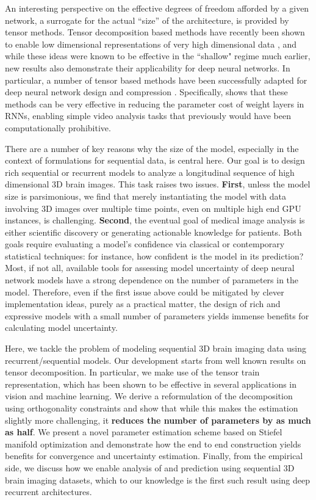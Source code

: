 An interesting perspective on the effective degrees of freedom afforded 
by a given network, a surrogate for the actual ``size'' of the architecture, 
is provided by tensor methods.
Tensor decomposition based methods have recently been shown to enable low dimensional representations of very high dimensional data \citep{hwangCvpr18}, 
and while these ideas were known to be effective in the ``shallow" regime much earlier, new results also demonstrate their applicability for deep neural 
networks. 
In particular, a number of tensor based methods have been successfully adapted for deep neural network design and compression \citep{cohen2016expressive,zhang2017tucker,yu2017compressing,xiong2019antnets}.
Specifically, \cite{pmlr-v70-yang17e} shows that these methods can be very effective in reducing the parameter cost of weight layers in RNNs, enabling simple video analysis tasks that previously would have been computationally prohibitive.

There are a number of key reasons why the size of the model, especially in the context of formulations for sequential data, is central here. Our goal is to design rich sequential or recurrent models to analyze a longitudinal sequence of high dimensional 3D brain images. 
This task raises two issues. \textbf{First}, 
unless the model size is parsimonious, we find that merely instantiating the 
model with data involving 3D images over multiple time points, even on multiple high end GPU instances, is challenging.
\textbf{Second}, 
the eventual goal of medical image analysis is either scientific discovery or generating 
actionable knowledge for patients. 
Both goals require evaluating a model's confidence via 
classical or contemporary statistical techniques: for instance, how confident is the model in its prediction?  
Most, if not all, available tools for assessing 
model uncertainty of deep neural network models 
have a strong dependence on the number of parameters in 
the model. Therefore, even if the first issue above could be mitigated by clever implementation ideas, purely as a practical 
matter, the design of rich and expressive models with a small number of parameters yields immense benefits for calculating model uncertainty.

Here,
we tackle the problem of modeling 
sequential 3D brain imaging data using 
recurrent/sequential models. 
Our development starts from well known results on tensor decomposition. In particular, we 
make use of the tensor train representation, which has been shown to be effective in several 
applications in vision and machine learning. We derive a reformulation of the decomposition using 
orthogonality constraints and show that while this makes the estimation slightly more challenging, 
it \textbf{reduces the number of parameters by as much as half}. 
We present a novel parameter estimation scheme based on Stiefel manifold optimization and demonstrate 
how the end to end construction yields benefits for convergence and uncertainty estimation. 
Finally, from the empirical side, we discuss how we enable analysis of and prediction using sequential 3D brain imaging datasets, which to our knowledge is the first such result using 
deep recurrent architectures. 
